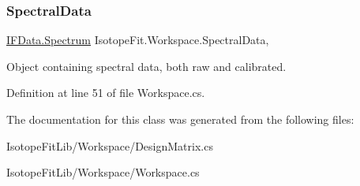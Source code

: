 \subsubsection{\texorpdfstring{Spectral\+Data}{SpectralData}}
{\footnotesize\ttfamily \hyperlink{class_isotope_fit_1_1_i_f_data_1_1_spectrum}{I\+F\+Data.\+Spectrum} Isotope\+Fit.\+Workspace.\+Spectral\+Data\hspace{0.3cm}{\ttfamily [get]}, {\ttfamily [set]}}



Object containing spectral data, both raw and calibrated. 



Definition at line 51 of file Workspace.\+cs.



The documentation for this class was generated from the following files\+:\begin{DoxyCompactItemize}
\item 
Isotope\+Fit\+Lib/\+Workspace/Design\+Matrix.\+cs\item 
Isotope\+Fit\+Lib/\+Workspace/Workspace.\+cs\end{DoxyCompactItemize}
